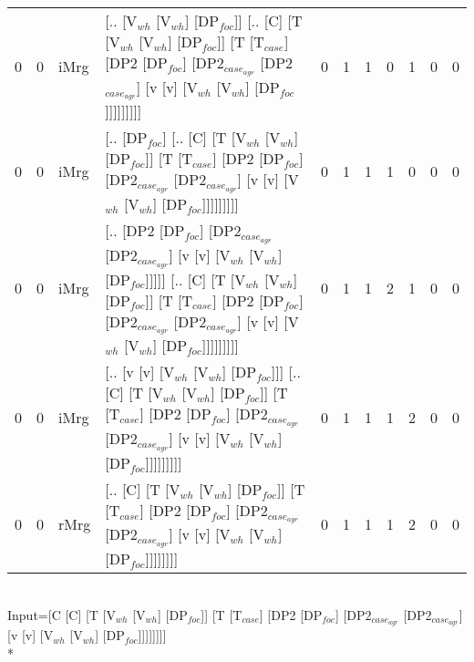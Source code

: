 \begin{tabularx}{\linewidth}{rrlXrrrrrrr}
   0 &   0 & iMrg & [.. [V$_{wh}$ [V$_{wh}$] [DP$_{foc}$]] [.. [C] [T [V$_{wh}$ [V$_{wh}$] [DP$_{foc}$]] [T [T$_{case}$] [DP2 [DP$_{foc}$] [DP2$_{case_{agr}}$ [DP2$_{case_{agr}}$] [v [v] [V$_{wh}$ [V$_{wh}$] [DP$_{foc}$]]]]]]]]]                                                                                              &            0 &             1 &             1 &            0 &             1 &              0 &             0 \\
   0 &   0 & iMrg & [.. [DP$_{foc}$] [.. [C] [T [V$_{wh}$ [V$_{wh}$] [DP$_{foc}$]] [T [T$_{case}$] [DP2 [DP$_{foc}$] [DP2$_{case_{agr}}$ [DP2$_{case_{agr}}$] [v [v] [V$_{wh}$ [V$_{wh}$] [DP$_{foc}$]]]]]]]]]                                                                                                            &            0 &             1 &             1 &            1 &             0 &              0 &             0 \\
   0 &   0 & iMrg & [.. [DP2 [DP$_{foc}$] [DP2$_{case_{agr}}$ [DP2$_{case_{agr}}$] [v [v] [V$_{wh}$ [V$_{wh}$] [DP$_{foc}$]]]]] [.. [C] [T [V$_{wh}$ [V$_{wh}$] [DP$_{foc}$]] [T [T$_{case}$] [DP2 [DP$_{foc}$] [DP2$_{case_{agr}}$ [DP2$_{case_{agr}}$] [v [v] [V$_{wh}$ [V$_{wh}$] [DP$_{foc}$]]]]]]]]]                                         &            0 &             1 &             1 &            2 &             1 &              0 &             0 \\
   0 &   0 & iMrg & [.. [v [v] [V$_{wh}$ [V$_{wh}$] [DP$_{foc}$]]] [.. [C] [T [V$_{wh}$ [V$_{wh}$] [DP$_{foc}$]] [T [T$_{case}$] [DP2 [DP$_{foc}$] [DP2$_{case_{agr}}$ [DP2$_{case_{agr}}$] [v [v] [V$_{wh}$ [V$_{wh}$] [DP$_{foc}$]]]]]]]]]                                                                                      &            0 &             1 &             1 &            1 &             2 &              0 &             0 \\
   0 &   0 & rMrg & [.. [C] [T [V$_{wh}$ [V$_{wh}$] [DP$_{foc}$]] [T [T$_{case}$] [DP2 [DP$_{foc}$] [DP2$_{case_{agr}}$ [DP2$_{case_{agr}}$] [v [v] [V$_{wh}$ [V$_{wh}$] [DP$_{foc}$]]]]]]]]                                                                                                                          &            0 &             1 &             1 &            1 &             2 &              0 &             0 \\
\hline
\end{tabularx}\endgroup\\
\begingroup\scriptsize Input=[C [C] [T [V$_{wh}$ [V$_{wh}$] [DP$_{foc}$]] [T [T$_{case}$] [DP2 [DP$_{foc}$] [DP2$_{case_{agr}}$ [DP2$_{case_{agr}}$] [v [v] [V$_{wh}$ [V$_{wh}$] [DP$_{foc}$]]]]]]]]\\*
